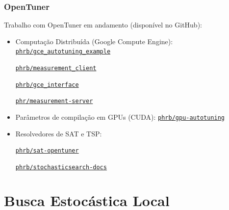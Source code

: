 \documentclass[10pt, compress]{beamer}
\begin{document}
\begin{frame}[fragile]
    \frametitle{OpenTuner}
    Trabalho com OpenTuner em andamento (disponível no \alert{GitHub}):
    \begin{itemize}
        \item Computação Distribuída (\alert{Google Compute Engine}):
            \href{https://github.com/phrb/gce\_autotuning\_example}{\tt phrb/gce\_autotuning\_example}

            \href{https://github.com/phrb/measurement\_client}{\tt phrb/measurement\_client}

            \href{https://github.com/phrb/gce\_interface}{\tt phrb/gce\_interface}

            \href{https://github.com/phrb/measurement-server}{\tt phr/measurement-server}
            \pause
        \item Parâmetros de compilação em GPUs (\alert{CUDA}):
            \href{https://github.com/phrb/gpu-autotuning}{\tt phrb/gpu-autotuning}
            \pause
        \item Resolvedores de \alert{SAT} e \alert{TSP}:

            \href{https://github.com/phrb/sat-opentuner}{\tt phrb/sat-opentuner}

            \href{https://github.com/phrb/stochasticsearch-docs}{\tt phrb/stochasticsearch-docs}
    \end{itemize}
\end{frame}

\section{Busca Estocástica Local}
\end{document}
